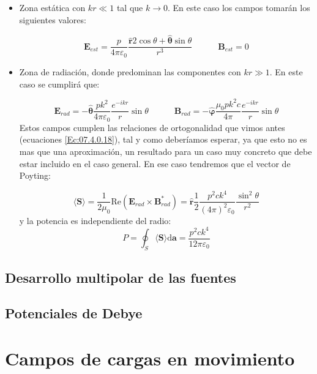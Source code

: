 \documentclass[12pt,a4paper]{article}
\newcommand{\parentesis}[1]{\left( #1  \right)}
\newcommand{\D}{\mathrm{d}}
\newcommand{\Real}{\mathrm{Re}}
\newcommand{\tquad}{\quad \quad \quad}
\newcommand{\Bn}{\mathbf{B}}
\newcommand{\En}{\mathbf{E}}
\newcommand{\an}{\mathbf{a}}
\newcommand{\Sn}{\mathbf{S}}
\newcommand{\hnr}{\hat{\mathbf{r}}}
\newcommand{\hntheta}{\hat{\boldsymbol{\theta}}}
\newcommand{\hnvarphi}{\hat{\boldsymbol{\varphi}}}
\numberwithin{equation}{section}
\numberwithin{figure}{section}
\begin{document}
\begin{itemize}
\item Zona estática con $k r \ll 1 $ tal que $k \rightarrow 0$. En este caso los campos tomarán los siguientes valores:

\begin{equation}
\En_{est} = \dfrac{p}{4 \pi \varepsilon_0} \dfrac{\hnr 2 \cos \theta + \hntheta \sin \theta}{r^3} \tquad \Bn_{est} = 0
\end{equation}

\item Zona de radiación, donde predominan las componentes con $k r \gg 1$. En este caso se cumplirá que:

\begin{equation}
\En_{rad} = - \hntheta \dfrac{p k^2}{4 \pi \varepsilon_0}  \dfrac{e^{-ikr}}{r} \sin \theta \tquad \Bn_{rad} = - \hnvarphi  \dfrac{\mu_0 p k^2 c}{4 \pi} \dfrac{e^{-ikr}}{r} \sin \theta
\end{equation}
Estos campos cumplen las relaciones de ortogonalidad que vimos antes (ecuaciones \ref{Ec:07.4.0.18}), tal y como deberíamos esperar, ya que esto no es mas que una aproximación, un resultado para un caso muy concreto que debe estar incluido en el caso general. En ese caso tendremos que el vector de Poyting:

\begin{equation}
\langle \Sn \rangle = \dfrac{1}{2 \mu_0} \Real \parentesis{\En_{rad} \times  \Bn_{rad}^* } = \hnr \dfrac{1}{2} \dfrac{p^2 c k^4}{(4 \pi)^2 \varepsilon_0} \dfrac{\sin^2 \theta}{r^2}
\end{equation}
y la potencia es independiente del radio:
\begin{equation}
P = \oint_S \langle \Sn \rangle \D \an =\dfrac{p^2 c k^4}{12 \pi \varepsilon_0}
\end{equation}
\end{itemize}

\subsection{Desarrollo multipolar de las fuentes}

\subsection{Potenciales de Debye}


\newpage

\section{Campos de cargas en movimiento}
\end{document}
